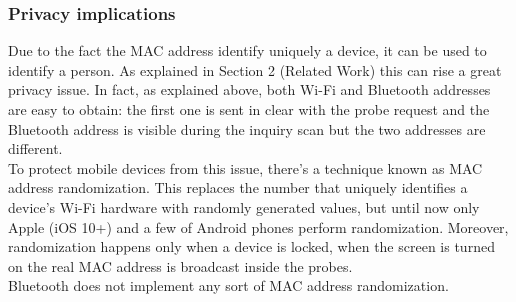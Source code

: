 \subsubsection{Privacy implications}
Due to the fact the MAC address identify uniquely a device, it can be used to identify a person. As explained in Section 2 (Related Work) this can rise a great privacy issue. In fact, as explained above, both Wi-Fi and Bluetooth addresses are easy to obtain: the first one is sent in clear with the probe request and the Bluetooth address is visible during the inquiry scan but the two addresses are different.\\
\linebreak
To protect mobile devices from this issue, there's a technique known as MAC address randomization. This replaces the number that uniquely identifies a device's Wi-Fi hardware with randomly generated values, but until now only Apple (iOS 10+) and a few of Android phones perform randomization. Moreover, randomization happens only when a device is locked, when the screen is turned on the real MAC address is broadcast inside the probes.\\
Bluetooth does not implement any sort of MAC address randomization.

